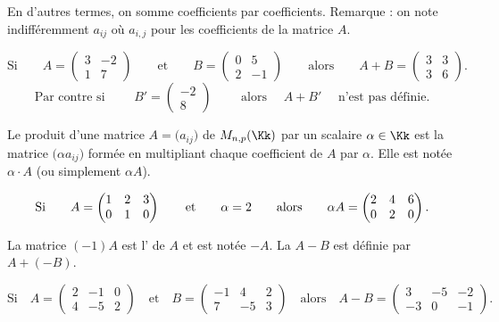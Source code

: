 \documentclass[class=report,crop=false]{standalone}
\begin{document}
En d'autres termes, on somme coefficients par coefficients.
Remarque : on note indifféremment $a_{ij}$ où $a_{i,j}$
pour les coefficients de la matrice $A$.


\begin{exemple}
$$\text{Si} \qquad
A  =  \begin{pmatrix}
3 & -2\\
1 & 7
\end{pmatrix}
\qquad \text{et} \qquad
B = \begin{pmatrix}
0 & 5 \\
2 & -1
    \end{pmatrix}
\qquad \text{alors} \qquad A + B = \begin{pmatrix}
3 & 3\\
3 & 6
\end{pmatrix}.
$$
$$
\text{Par contre si } \qquad
B' =  \begin{pmatrix}
-2\\8  \end{pmatrix}
\qquad \text{ alors } \quad A+B' \quad \text{ n'est pas définie.}
$$
\end{exemple}


\begin{definition}
Le produit d'une matrice $A=\big(a_{ij}\big)$ de $M_{n,p}(\Kk)$
par un scalaire $\alpha \in \Kk$ est la matrice
$\big(\alpha a_{ij}\big)$ formée en
multipliant chaque coefficient de $A$ par $\alpha$. Elle est notée $\alpha \cdot A$ (ou simplement $\alpha A$).
\end{definition}

\begin{exemple}
$$
\text{Si} \qquad
A  = \begin{pmatrix}
1& 2 & 3\cr
0& 1& 0\cr
\end{pmatrix}
\qquad \text{et} \qquad \alpha = 2
\qquad \text{alors} \qquad
\alpha A =
\begin{pmatrix}
2& 4 & 6\cr
0& 2& 0\cr
\end{pmatrix}.$$
\end{exemple}



La matrice $(-1)A$ est l' de $A$ et est notée $-A$.
La  $A-B$ est définie par $A + (-B)$.

\begin{exemple}
$$\text{Si} \quad A =  \begin{pmatrix}
2 & -1 & 0\\
4 & -5 & 2
\end{pmatrix}
\quad \text{et} \quad
B  =  \begin{pmatrix}
-1 & 4 & 2\\
7 & -5 & 3
\end{pmatrix}
\quad \text{alors} \quad
A-B  = \begin{pmatrix}
3 & -5 & -2\\
-3 & 0 & -1
\end{pmatrix}.$$
\end{exemple}
\end{document}
